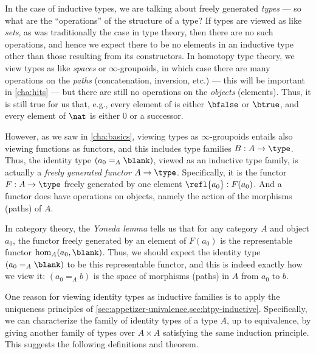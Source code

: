 In the case of inductive types, we are talking about freely generated \emph{types} --- so what are the ``operations'' of the structure of a type?
If types are viewed as like \emph{sets}, as was traditionally the case in type theory, then there are no such operations, and hence we expect there to be no elements in an inductive type other than those resulting from its constructors.
In homotopy type theory, we view types as like \emph{spaces} or $\infty$-groupoids,%
in which case there are many operations on the \emph{paths} (concatenation, inversion, etc.) --- this will be important in \cref{cha:hits} --- but there are still no operations on the \emph{objects} (elements).
Thus, it is still true for us that, e.g., every element of \bool is either $\bfalse$ or $\btrue$, and every element of $\nat$ is either $0$ or a successor.

However, as we saw in \cref{cha:basics}, viewing types as $\infty$-groupoids entails also viewing functions as functors, and this includes type families $B:A\to\type$.
Thus, the identity type $(a_0 =_A \blank)$, viewed as an inductive type family, is actually a \emph{freely generated functor} $A\to\type$.
Specifically, it is the functor $F:A\to\type$ freely generated by one element $\refl{a_0}: F(a_0)$.
And a functor does have operations on objects, namely the action of the morphisms (paths) of $A$.

In category theory, the \emph{Yoneda lemma} tells us that for any category $A$ and object $a_0$, the functor freely generated by an element of $F(a_0)$ is the representable functor $\hom_A(a_0,\blank)$.
Thus, we should expect the identity type $(a_0 =_A \blank)$ to be this representable functor, and this is indeed exactly how we view it: $(a_0 =_A b)$ is the space of morphisms (paths) in $A$ from $a_0$ to $b$.


\mentalpause

One reason for viewing identity types as inductive families is to apply the uniqueness principles of \cref{sec:appetizer-univalence,sec:htpy-inductive}.
Specifically, we can characterize the family of identity types of a type $A$, up to equivalence, by giving another family of types over $A\times A$ satisfying the same induction principle.
This suggests the following definitions and theorem.

%
%


